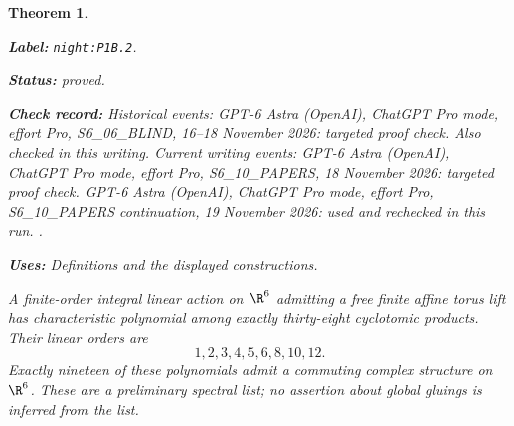 \documentclass[11pt,a4paper]{article}
\newtheorem{theorem}{Theorem}[section]
\theoremstyle{definition}
\newcommand{\StatementRecord}[4]{\par\smallskip\begingroup\upshape\raggedright\noindent\textbf{Label:} \nolinkurl{#1}.\par\noindent\textbf{Status:} #2.\par\noindent\textbf{Check record:} #3.\par\noindent\textbf{Uses:} #4.\par\endgroup\smallskip}
\begin{document}
\begin{theorem}\label{night:P1B.2}
\StatementRecord{night:P1B.2}{proved}{Historical events: GPT-6 Astra (OpenAI), ChatGPT Pro mode, effort Pro, S6\_06\_BLIND, 16--18 November 2026: targeted proof check. Also checked in this writing. Current writing events: GPT-6 Astra (OpenAI), ChatGPT Pro mode, effort Pro, S6\_10\_PAPERS, 18 November 2026: targeted proof check. GPT-6 Astra (OpenAI), ChatGPT Pro mode, effort Pro, S6\_10\_PAPERS continuation, 19 November 2026: used and rechecked in this run. }{Definitions and the displayed constructions}
A finite-order integral linear action on $\R^6$ admitting a
free finite affine torus lift has characteristic polynomial
among exactly thirty-eight cyclotomic products. Their linear
orders are
\[
 1,2,3,4,5,6,8,10,12.
\]
Exactly nineteen of these polynomials admit a commuting complex
structure on $\R^6$. These are a preliminary spectral list;
no assertion about global gluings is inferred from the list.
\end{theorem}
\end{document}
